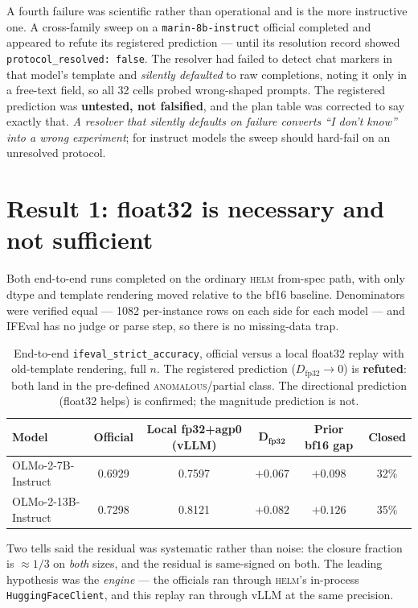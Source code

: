 \documentclass[11pt]{report}
\newcommand{\code}[1]{\texttt{#1}}
\begin{document}
A fourth failure was scientific rather than operational and is the more instructive
one. A cross-family sweep on a \code{marin-8b-instruct} official completed and
appeared to refute its registered prediction --- until its resolution record showed
\code{protocol\_resolved: false}. The resolver had failed to detect chat markers in
that model's template and \emph{silently defaulted} to raw completions, noting it
only in a free-text field, so all 32 cells probed wrong-shaped prompts. The
registered prediction was \textbf{untested, not falsified}, and the plan table was
corrected to say exactly that. \emph{A resolver that silently defaults on failure
converts ``I don't know'' into a wrong experiment}; for instruct models the sweep
should hard-fail on an unresolved protocol.

\section{Result 1: float32 is necessary and not sufficient}

Both end-to-end runs completed on the ordinary \textsc{helm} from-spec path, with
only dtype and template rendering moved relative to the bf16 baseline. Denominators
were verified equal --- 1082 per-instance rows on each side for each model --- and
IFEval has no judge or parse step, so there is no missing-data trap.

\begin{table}[H]
\centering
\small
\begin{tabular}{lccccc}
\toprule
\textbf{Model} & \textbf{Official} & \textbf{Local fp32+agp0 (vLLM)} &
$\mathbf{D_{\text{fp32}}}$ & \textbf{Prior bf16 gap} & \textbf{Closed} \\
\midrule
OLMo-2-7B-Instruct  & 0.6929 & 0.7597 & $+0.067$ & $+0.098$ & 32\% \\
OLMo-2-13B-Instruct & 0.7298 & 0.8121 & $+0.082$ & $+0.126$ & 35\% \\
\bottomrule
\end{tabular}
\caption{End-to-end \code{ifeval\_strict\_accuracy}, official versus a local float32
replay with old-template rendering, full $n$. The registered prediction
($D_{\text{fp32}}\rightarrow0$) is \textbf{refuted}: both land in the
pre-defined \textsc{anomalous}/partial class. The directional prediction (float32
helps) is confirmed; the magnitude prediction is not.}
\label{tab:fp32e2e}
\end{table}

Two tells said the residual was systematic rather than noise: the closure fraction is
$\approx1/3$ on \emph{both} sizes, and the residual is same-signed on both. The
leading hypothesis was the \emph{engine} --- the officials ran through \textsc{helm}'s
in-process \code{HuggingFaceClient}, and this replay ran through vLLM at the same
precision.
\end{document}
